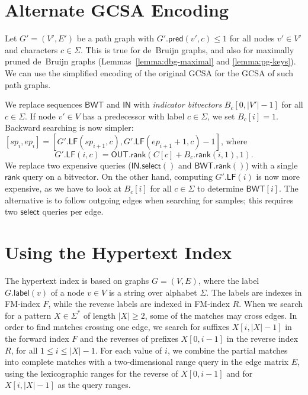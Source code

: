 \documentclass[a4paper,UKenglish]{lipics-v2016}
\newcommand{\abs}[1]{\ensuremath{\lvert #1 \rvert}}
\newcommand{\rank}{\ensuremath{\mathsf{rank}}}
\newcommand{\select}{\ensuremath{\mathsf{select}}}
\newcommand{\LF}{\ensuremath{\mathsf{LF}}}
\newcommand{\glabel}{\ensuremath{\mathsf{label}}}
\newcommand{\gpred}{\ensuremath{\mathsf{pred}}}
\newcommand{\BWT}{\ensuremath{\mathsf{BWT}}}
\newcommand{\bvIN}{\ensuremath{\mathsf{IN}}}
\newcommand{\bvOUT}{\ensuremath{\mathsf{OUT}}}
\begin{document}
\section{Alternate GCSA Encoding}\label{appendix:encoding}

Let $G' = (V', E')$ be a path graph with $G'.\gpred(v', c) \le 1$ for all nodes $v' \in V'$ and characters $c \in \Sigma$. This is true for de~Bruijn graphs, and also for maximally pruned de~Bruijn graphs (Lemmas~\ref{lemma:dbg-maximal} and \ref{lemma:pg-keys}). We can use the simplified encoding of the original GCSA \cite{Siren2014} for the GCSA of such path graphs.

We replace sequences $\BWT$ and $\bvIN$ with \emph{indicator bitvectors} $B_{c}[0, \abs{V'}-1]$ for all $c \in \Sigma$. If node $v' \in V$ has a predecessor with label $c \in \Sigma$, we set $B_{c}[i] = 1$. Backward searching is now simpler: $[sp_{i}, ep_{i}] = [G'.\LF(sp_{i+1}, c), G'.\LF(ep_{i+1}+1, c) - 1]$, where
$$
G'.\LF(i, c) = \bvOUT.\rank(C[c] + B_{c}.\rank(i, 1), 1).
$$
We replace two expensive queries ($\bvIN.\select()$ and $\BWT.\rank()$) with a single $\rank$ query on a bitvector. On the other hand, computing $G'.\LF(i)$ is now more expensive, as we have to look at $B_{c}[i]$ for all $c \in \Sigma$ to determine $\BWT[i]$. The alternative is to follow outgoing edges when searching for samples; this requires two $\select$ queries per edge.


\section{Using the Hypertext Index}\label{appendix:hypertext}

The hypertext index \cite{Thachuk2013} is based on graphs $G = (V, E)$, where the label $G.\glabel(v)$ of a node $v \in V$ is a string over alphabet $\Sigma$. The labels are indexes in FM\nobreakdash-index $F$, while the reverse labels are indexed in FM\nobreakdash-index $R$. When we search for a pattern $X \in \Sigma^{\ast}$ of length $\abs{X} \ge 2$, some of the matches may cross edges. In order to find matches crossing one edge, we search for suffixes $X[i, \abs{X}-1]$ in the forward index $F$ and the reverses of prefixes $X[0, i-1]$ in the reverse index $R$, for all $1 \le i \le \abs{X}-1$. For each value of $i$, we combine the partial matches into complete matches with a two-dimensional range query in the edge matrix $E$, using the lexicographic ranges for the reverse of $X[0, i-1]$ and for $X[i, \abs{X}-1]$ as the query ranges.
\end{document}
